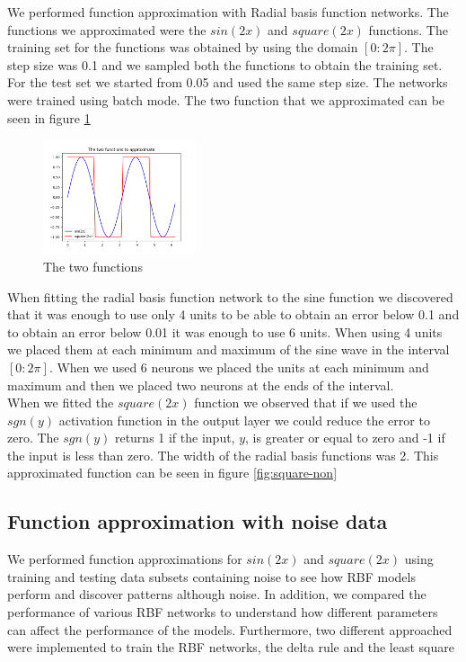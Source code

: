 \documentclass[a4paper]{article}
\begin{document}
We performed function approximation with Radial basis function networks. The functions we approximated were the $sin(2x)$ and $square(2x)$ functions. The training set for the functions was obtained by using the domain $[0:2\pi]$. The step size was 0.1 and we sampled both the functions to obtain the training set. For the test set we started from 0.05 and used the same step size. The networks were trained using batch mode. The two function that we approximated can be seen in figure \ref{fig:two-functions}\\

\begin{figure}
    \centering
    \includegraphics[width=0.4\textwidth]{Labs/Lab 2/Steinar/results/two-functions.png}
    \caption{The two functions}
    \label{fig:two-functions}
\end{figure}

When fitting the radial basis function network to the sine function we discovered that it was enough to use only 4 units to be able to obtain an error below 0.1 and to obtain an error below 0.01 it was enough to use 6 units. When using 4 units we placed them at each minimum and maximum of the sine wave in the interval $[0:2\pi]$. When we used 6 neurons we placed the units at each minimum and maximum and then we placed two neurons at the ends of the interval. \\

When we fitted the $square(2x)$ function we observed that if we used the $sgn(y)$ activation function in the output layer we could reduce the error to zero. The $sgn(y)$ returns 1 if the input, $y$, is greater or equal to zero and -1 if the input is less than zero. The width of the radial basis functions was 2. This approximated function can be seen in figure \ref{fig:square-non} 



\subsection{Function approximation with noise data}
We performed function approximations for $sin(2x)$ and $square(2x)$ using training and testing data subsets containing noise to see how RBF models perform and discover patterns although noise. In addition, we compared the performance of various RBF networks to understand how different parameters can affect the performance of the models. Furthermore, two different approached were implemented to train the RBF networks, the delta rule and the least square
\end{document}
